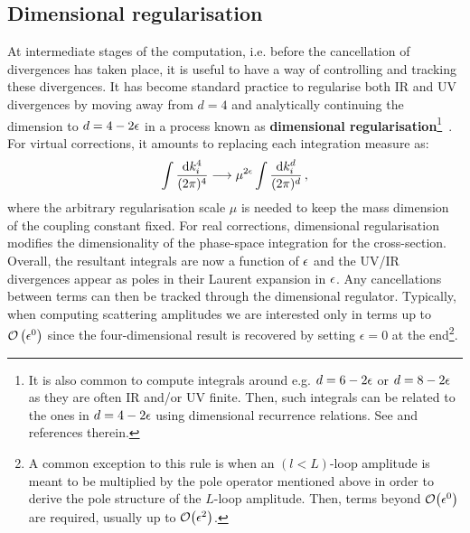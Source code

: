 \documentclass[main.tex]{subfiles}
\begin{document}
\subsection{Dimensional regularisation} \label{sec:dimreg}
At intermediate stages of the computation, i.e. before the cancellation of divergences has taken place, it is useful to have a way of controlling and tracking these divergences. It has become standard practice to regularise both IR and UV divergences by moving away from $d=4$ and analytically continuing the dimension to $d=4-2\epsilon$ in a process known as \textbf{dimensional regularisation}\footnote{It is also common to compute integrals around e.g. $d=6-2\epsilon$ or $d=8-2\epsilon$ as they are often IR and/or UV finite. Then, such integrals can be related to the ones in $d=4-2\epsilon$ using dimensional recurrence relations. See \cite{Bern:1993kr, Lee:2012cn} and references therein.}~\cite{bollini1964analytic, THOOFT1972189}. For virtual corrections, it amounts to replacing each integration measure as:
\begin{equation}
    \int \frac{\mathrm{d} k_i^{4}}{(2\pi)^4} \longrightarrow \mu^{2\epsilon} \int \frac{\mathrm{d} k_i^{d}}{(2\pi)^d}\,,
\end{equation}
where the arbitrary regularisation scale $\mu$ is needed to keep the mass dimension of the coupling constant fixed. For real corrections, dimensional regularisation modifies the dimensionality of the phase-space integration for the cross-section. Overall, the resultant integrals are now a function of $\epsilon$ and the UV/IR divergences appear as poles in their Laurent expansion in $\epsilon$. Any cancellations between terms can then be tracked through the dimensional regulator. Typically, when computing scattering amplitudes we are interested only in terms up to $\mathcal{O}\left(\epsilon^0\right)$ since the four-dimensional result is recovered by setting $\epsilon = 0$ at the end\footnote{A common exception to this rule is when an $(l<L)$-loop amplitude is meant to be multiplied by the pole operator mentioned above in order to derive the pole structure of the $L$-loop amplitude. Then, terms beyond $\mathcal{O}\big(\epsilon^0\big)$ are required, usually up to $\mathcal{O}\big(\epsilon^2\big)$.}.
\end{document}
